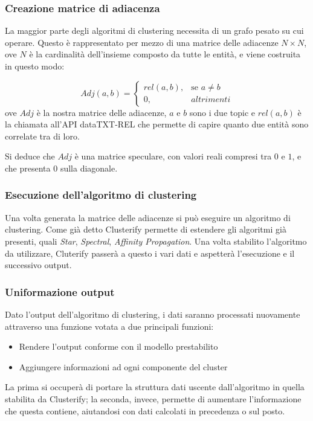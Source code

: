 		\subsubsection{Creazione matrice di adiacenza}
			La maggior parte degli algoritmi di clustering necessita di un grafo pesato su cui operare. Questo è rappresentato per mezzo di una matrice delle adiacenze $N \times N$, ove $N$ è la cardinalità dell'insieme composto da tutte le entità, e viene costruita in questo modo:

			\begin{equation*}
				Adj(a, b) = \begin{cases} 
					rel(a,b), & \mbox{se } a \neq b \\ 
					0, & altrimenti 
				\end{cases}
			\end{equation*}
			ove $Adj$ è la nostra matrice delle adiacenze, $a$ e $b$ sono i due topic e $rel(a,b)$ è la chiamata all'API dataTXT-REL che permette di capire quanto due entità sono correlate tra di loro.
			
			Si deduce che $Adj$ è una matrice speculare, con valori reali compresi tra $0$ e $1$, e che presenta $0$ sulla diagonale.

		\subsubsection{Esecuzione dell'algoritmo di clustering}
			Una volta generata la matrice delle adiacenze si può eseguire un algoritmo di clustering. Come già detto Clusterify permette di estendere gli algoritmi già presenti, quali \emph{Star}, \emph{Spectral}, \emph{Affinity Propagation}. Una volta stabilito l'algoritmo da utilizzare, Cluterify passerà a questo i vari dati e aspetterà l'esecuzione e il successivo output.

		\subsubsection{Uniformazione output}
			Dato l'output dell'algoritmo di clustering, i dati saranno processati nuovamente attraverso una funzione votata a due principali funzioni:
			\begin{itemize}
  				\item Rendere l'output conforme con il modello prestabilito
	  			\item Aggiungere informazioni ad ogni componente del cluster
 			\end{itemize} 
			
			La prima si occuperà di portare la struttura dati uscente dall'algoritmo in quella stabilita da Clusterify; la seconda, invece, permette di aumentare l'informazione che questa contiene, aiutandosi con dati calcolati in precedenza o sul posto.



















